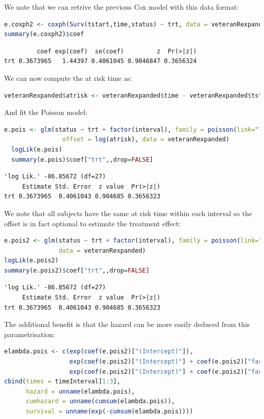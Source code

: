 \documentclass{article}
\begin{document}
\clearpage

We note that we can retrive the previous Cox model with this data
format:
\begin{lstlisting}[language=r,numbers=none]
e.coxph2 <- coxph(Surv(tstart,time,status) ~ trt, data = veteranRexpanded)
summary(e.coxph2)$coef
\end{lstlisting}

\label{}
\begin{verbatim}
         coef exp(coef)  se(coef)         z  Pr(>|z|)
trt 0.3673965   1.44397 0.4061045 0.9046847 0.3656324
\end{verbatim}


We can now compute the at risk time as:
\begin{lstlisting}[language=r,numbers=none]
veteranRexpanded$atrisk <- veteranRexpanded$time - veteranRexpanded$tstart
\end{lstlisting}

And fit the Poisson model:
\begin{lstlisting}[language=r,numbers=none]
  e.pois <- glm(status ~ trt + factor(interval), family = poisson(link="log"),
                offset = log(atrisk), data = veteranRexpanded)
  logLik(e.pois)
  summary(e.pois)$coef["trt",,drop=FALSE]
\end{lstlisting}

\label{}
\begin{verbatim}
'log Lik.' -86.85672 (df=27)
     Estimate Std. Error  z value  Pr(>|z|)
trt 0.3673965  0.4061043 0.904685 0.3656323
\end{verbatim}


We note that all subjects have the same at risk time within each
interval so the offset is in fact optional to estimate the treatment effect:
\begin{lstlisting}[language=r,numbers=none]
e.pois2 <- glm(status ~ trt + factor(interval), family = poisson(link="log"),
               data = veteranRexpanded)
logLik(e.pois2)
summary(e.pois2)$coef["trt",,drop=FALSE]
\end{lstlisting}

\label{}
\begin{verbatim}
'log Lik.' -86.85672 (df=27)
     Estimate Std. Error  z value  Pr(>|z|)
trt 0.3673965  0.4061043 0.904685 0.3656323
\end{verbatim}


The additional benefit is that the hazard can be more easily deduced
from this parametrisation:
\begin{lstlisting}[language=r,numbers=none]
elambda.pois <- c(exp(coef(e.pois2)["(Intercept)"]),
                  exp(coef(e.pois2)["(Intercept)"] + coef(e.pois2)["factor(interval)2"]),
                  exp(coef(e.pois2)["(Intercept)"] + coef(e.pois2)["factor(interval)3"]))
cbind(times = timeInterval[1:3],
      hazard = unname(elambda.pois),
      cumhazard = unname(cumsum(elambda.pois)),
      survival = unname(exp(-cumsum(elambda.pois)))) 
\end{lstlisting}
\end{document}
